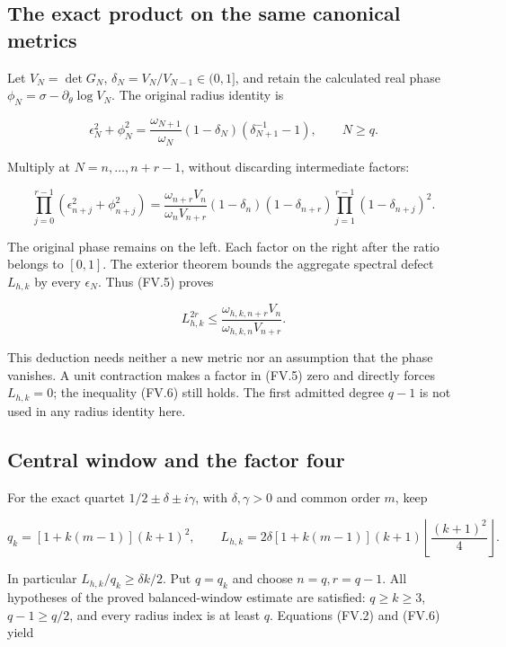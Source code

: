 \subsection[\hspace{0.4em}The exact product on the same canonical metrics]{The exact product on the same canonical metrics}\label{four-volume-the-exact-product-on-the-same-canonical-metrics}

Let \(V_N=\det G_N\), \(\delta_N=V_N/V_{N-1}\in(0,1]\), and retain the calculated real phase \(\phi_N=\sigma-\partial_\theta\log V_N\). The original radius identity is

\[
\epsilon_N^2+\phi_N^2
=\frac{\omega_{N+1}}{\omega_N}
 (1-\delta_N)(\delta_{N+1}^{-1}-1),\qquad N\ge q.
\]

Multiply at \(N=n,\ldots,n+r-1\), without discarding intermediate factors:

\[
\prod_{j=0}^{r-1}(\epsilon_{n+j}^2+\phi_{n+j}^2)
=\frac{\omega_{n+r}V_n}{\omega_nV_{n+r}}
(1-\delta_n)(1-\delta_{n+r})
\prod_{j=1}^{r-1}(1-\delta_{n+j})^2.
\tag{FV.5}
\]

The original phase remains on the left. Each factor on the right after the ratio belongs to \([0,1]\). The exterior theorem bounds the aggregate spectral defect \(L_{h,k}\) by every \(\epsilon_N\). Thus (FV.5) proves

\[
L_{h,k}^{2r}\le
\frac{\omega_{h,k,n+r}V_n}{\omega_{h,k,n}V_{n+r}}.
\tag{FV.6}
\]

This deduction needs neither a new metric nor an assumption that the phase vanishes. A unit contraction makes a factor in (FV.5) zero and directly forces \(L_{h,k}=0\); the inequality (FV.6) still holds. The first admitted degree \(q-1\) is not used in any radius identity here.

\subsection[\hspace{0.4em}Central window and the factor four]{Central window and the factor four}\label{four-volume-central-window-and-the-factor-four}

For the exact quartet \(1/2\pm\delta\pm i\gamma\), with \(\delta,\gamma>0\) and common order \(m\), keep

\[
q_k=[1+k(m-1)](k+1)^2,\qquad
L_{h,k}=2\delta[1+k(m-1)](k+1)
\left\lfloor\frac{(k+1)^2}{4}\right\rfloor.
\]

In particular \(L_{h,k}/q_k\ge\delta k/2\). Put \(q=q_k\) and choose \(n=q,r=q-1\). All hypotheses of the proved balanced-window estimate are satisfied: \(q\ge k\ge3\), \(q-1\ge q/2\), and every radius index is at least \(q\). Equations (FV.2) and (FV.6) yield

